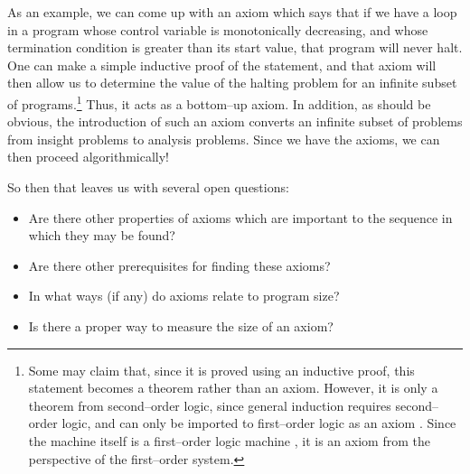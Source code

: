 As an example, we can come up with an axiom which says that if we have a loop in a program whose control variable is monotonically decreasing, and whose termination condition is greater than its start value, that program will never halt.  One can make a simple inductive proof of the statement, and that axiom will then allow us to determine the value of the halting problem for an infinite subset of programs.\footnote{Some may claim that, since it is proved using an inductive proof, this statement becomes a theorem rather than an axiom.  However, it is only a theorem from second--order logic, since general induction requires second--order logic, and can only be imported to first--order logic as an axiom \citep{enderton2012}.  Since the machine itself is a first--order logic machine \citep{turing1936}, it is an axiom from the perspective of the first--order system.}  Thus, it acts as a bottom--up axiom.  In addition, as should be obvious, the introduction of such an axiom converts an infinite subset of problems from insight problems to analysis problems.  Since we have the axioms, we can then proceed algorithmically!

So then that leaves us with several open questions:

\begin{itemize}
\item Are there other properties of axioms which are important to the sequence in which they may be found?
\item Are there other prerequisites for finding these axioms?
\item In what ways (if any) do axioms relate to program size?
\item Is there a proper way to measure the size of an axiom?
\end{itemize}

